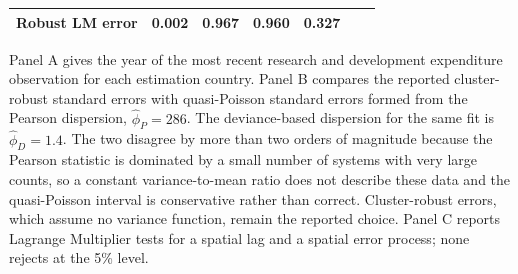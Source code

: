\documentclass[ASNA,twocolumn]{USG}
\begin{document}
\begin{table}[t]
\begin{tabular*}{\textwidth}{@{\extracolsep\fill}l r r r r r r@{}}
Robust LM error & 0.002 & 0.967 & 0.960 & 0.327 & \\
\bottomrule
\end{tabular*}
\begin{tablenotes}
\item[] Panel A gives the year of the most recent research and development expenditure observation for each estimation country. Panel B compares the reported cluster-robust standard errors with quasi-Poisson standard errors formed from the Pearson dispersion, $\hat\phi_{P} = 286$. The deviance-based dispersion for the same fit is $\hat\phi_{D} = 1.4$. The two disagree by more than two orders of magnitude because the Pearson statistic is dominated by a small number of systems with very large counts, so a constant variance-to-mean ratio does not describe these data and the quasi-Poisson interval is conservative rather than correct. Cluster-robust errors, which assume no variance function, remain the reported choice. Panel C reports Lagrange Multiplier tests for a spatial lag and a spatial error process; none rejects at the 5\% level.
\end{tablenotes}
\end{table}
\end{document}
